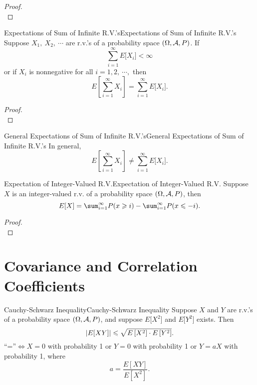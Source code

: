\documentclass{elegantbook}
\begin{document}
\begin{proof}
\\[4cm]\vspace{0.01cm}
\end{proof}

\begin{theorem}{Expectations of Sum of Infinite R.V.'s}{Expectations of Sum of Infinite R.V.'s}
Suppose \(X_{1},\ X_{2},\ \cdots\) are r.v.'s of a probability space $(\Omega,\mathcal{A}, P)$. If \[\sum_{i = 1}^{\infty}{E\lbrack X_{i}\rbrack} < \infty\] or if
\(X_{i}\) is nonnegative for all \(i = 1,2,\ \cdots,\) then
\[E\left\lbrack \sum_{i = 1}^{\infty}X_{i} \right\rbrack = \sum_{i = 1}^{\infty}{E\lbrack X_{i}\rbrack}.\]
\end{theorem}

\begin{proof}
\\[4cm]\vspace{0.01cm}
\end{proof}

\begin{remark}{General Expectations of Sum of Infinite R.V.'s}{General Expectations of Sum of Infinite R.V.'s}
In general,
\[E\left\lbrack \sum_{i = 1}^{\infty}X_{i} \right\rbrack \neq \sum_{i = 1}^{\infty}{E\lbrack X_{i}\rbrack}.\]
\end{remark}

\begin{corollary}{Expectation of Integer-Valued R.V.}{Expectation of Integer-Valued R.V.}
Suppose \(X\) is an integer-valued r.v. of a probability space $(\Omega,\mathcal{A}, P)$, then
\[E[X] = \sum_{i = 1}^{\infty}{P(x \gs i)} - \sum_{i = 1}^{\infty}{P( x \ls - i )}.\]
\end{corollary}

\begin{proof}
\\[4cm]\vspace{0.01cm}
\end{proof}

\section{Covariance and Correlation Coef\/f\/icients}

\begin{theorem}{Cauchy-Schwarz Inequality}{Cauchy-Schwarz Inequality}
Suppose \(X\) and \(Y\) are r.v.'s of a probability space $(\Omega,\mathcal{A}, P)$, and suppose \(E\lbrack X^{2}\rbrack\) and \(E\lbrack Y^{2}\rbrack\)
exists. Then
\[\left| E[XY] \right| \leqslant \sqrt{E\left\lbrack X^{2} \right\rbrack \cdot E\left\lbrack Y^{2} \right\rbrack}.\]
\(\text{``=''}  \Leftrightarrow X = 0\) with probability 1 or \(Y = 0\) with probability 1 or \(Y = aX\) with probability 1, where
\[a = \frac{E[XY]}{E\left\lbrack X^{2} \right\rbrack}.\]
\end{theorem}
\end{document}
